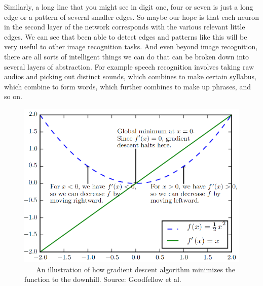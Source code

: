 \documentclass[master]{thesis-uestc}
\begin{document}
Similarly, a long line that you might see in digit one, four or seven is just a long edge or a pattern of several smaller edges. So maybe our hope is that each neuron in the second layer of the network corresponds with the various relevant little edges. We can see that been able to detect edges and patterns like this will be very useful to other image recognition tasks. And even beyond image recognition, there are all sorts of intelligent things we can do that can be broken down into several layers of abstraction. For example speech recognition involves taking raw audios and picking out distinct sounds, which combines to make certain syllabus, which combine to form words, which further combines to make up phrases, and so on.

\begin{figure}[ht]
\includegraphics[width=5in]{pic/gradient_descent.PNG}
\caption{\,\,\,\,\,\,\,\,\,\,An illustration of how gradient descent algorithm minimizes the function to the downhill. Source: Goodfellow et al.\cite{Goodfellow-et-al-2016}}
\label{fig_gradient_descent}
\end{figure}
\end{document}
